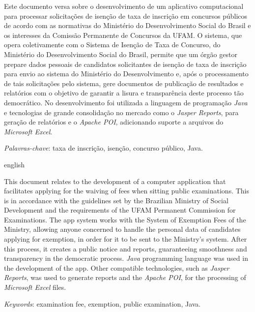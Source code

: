 \documentclass[
	12pt,			%
	openright,		%
	oneside,	
	a4paper,		%
	english,		%
	brazil			%
]{abntex2/abntex2}  %
\begin{document}
	\setlength{\absparsep}{18pt}
	\begin{resumo}

		Este documento versa sobre o desenvolvimento de um aplicativo computacional para processar solicitações de isenção de taxa de inscrição em concursos públicos de acordo com as normativas do Ministério do Desenvolvimento Social do Brasil e os interesses da Comissão Permanente de Concursos da UFAM. O sistema, que opera coletivamente com o Sistema de Isenção de Taxa de Concurso, do Ministério do Desenvolvimento Social do Brasil, permite que um órgão gestor prepare dados pessoais de candidatos solicitantes de isenção de taxa de inscrição para envio ao sistema do Ministério do Desenvolvimento e, após o processamento de tais solicitações pelo sistema, gere documentos de publicação de resultados e relatórios com o objetivo de garantir a lisura e transparência deste processo tão democrático. No desenvolvimento foi utilizada a linguagem de programação \textit{Java} e tecnologias de grande consolidação no mercado como o \textit{Jasper Reports}, para geração de relatórios e o \textit{Apache POI}, adicionando suporte a arquivos do \textit{Microsoft Excel}.

		\vspace{\onelineskip}

		\noindent
		\textit{Palavras-chave}: taxa de inscrição, isenção, concurso público, Java.

	\end{resumo}

	\begin{abstracteng}[Abstract]
		\begin{otherlanguage*}{english}
		
			This document relates to the development of a computer application that facilitates applying for the waiving of fees when sitting public examinations. This is in accordance with the guidelines set by the Brazilian Ministry of Social Development and the requirements of the UFAM Permanent Commission for Examinations. The app system works with the System of Exemption Fees of the Ministry, allowing anyone concerned to handle the personal data of candidates applying for exemption, in order for it to be sent to the Ministry's system. After this process, it creates a public notice and reports, guaranteeing smoothness and transparency in the democratic process. \textit{Java} programming language was used in the development of the app. Other compatible technologies, such as \textit{Jasper Reports}, was used to generate reports and the \textit{Apache POI}, for the processing of \textit{Microsoft Excel} files.

			\vspace{\onelineskip}
			\noindent
			\textit{Keywords}: examination fee, exemption, public examination, Java.
	
		\end{otherlanguage*}
	\end{abstracteng}
\end{document}
